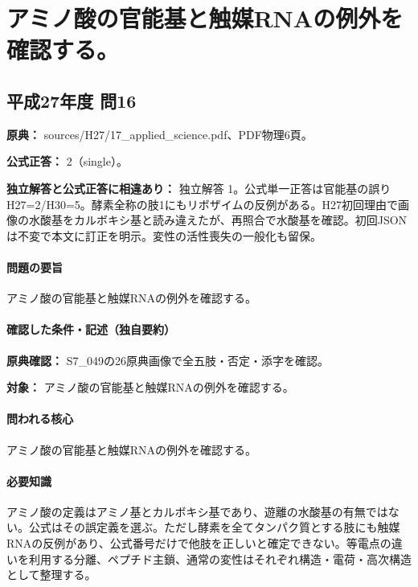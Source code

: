 \section{アミノ酸の官能基と触媒RNAの例外を確認する。}

\subsection{平成27年度 問16}
\label{q:h27-reg-applied-16}

\noindent\textbf{原典：} sources/H27/17\_applied\_science.pdf、PDF物理6頁。

\textbf{公式正答：} 2（single）。

\par\textbf{独立解答と公式正答に相違あり：} 独立解答 1。公式単一正答は官能基の誤りH27=\allowbreak{}2/H30=\allowbreak{}5。酵素全称の肢1にもリボザイムの反例がある。H27初回理由で画像の水酸基をカルボキシ基と読み違えたが、再照合で水酸基を確認。初回JSONは不変で本文に訂正を明示。変性の活性喪失の一般化も留保。

\paragraph{問題の要旨} アミノ酸の官能基と触媒RNAの例外を確認する。

\paragraph{確認した条件・記述（独自要約）}\mbox{}\par

\noindent\textbf{原典確認：} S7\_049の26原典画像で全五肢・否定・添字を確認。\par

\noindent\textbf{対象：} アミノ酸の官能基と触媒RNAの例外を確認する。\par

\paragraph{問われる核心} アミノ酸の官能基と触媒RNAの例外を確認する。

\paragraph{必要知識} アミノ酸の定義はアミノ基とカルボキシ基であり、遊離の水酸基の有無ではない。公式はその誤定義を選ぶ。ただし酵素を全てタンパク質とする肢にも触媒RNAの反例があり、公式番号だけで他肢を正しいと確定できない。等電点の違いを利用する分離、ペプチド主鎖、通常の変性はそれぞれ構造・電荷・高次構造として整理する。

